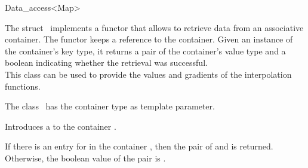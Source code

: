 \begin{ccRefClass}{Data_access<Map>}  %

\ccDefinition
  
The struct \ccRefName\ implements a functor that allows to retrieve
data from an associative container. The functor keeps a reference to
the container. Given an instance of the container's key type, it
returns a pair of the container's value type and a boolean indicating
whether the retrieval was successful.\\

This class can be used to provide the values and gradients of the
interpolation functions.


\ccParameters The class
\ccRefName\ has the container type  as template parameter.

\ccTypes 
{}
\ccGlue
{}
\ccCreation
{}  %
{Introduces a  to the container .}


 {If
  there is an entry for  in the container , then the
  pair of  and  is returned. Otherwise, the
  boolean value of the pair is .}

\end{ccRefClass}


